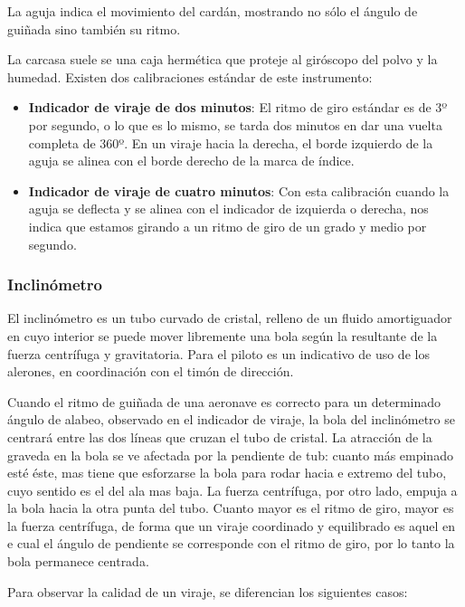 \documentclass{article}
\begin{document}
La aguja indica el movimiento del cardán, mostrando no sólo el ángulo de guiñada
sino también su ritmo.

La carcasa suele se una caja hermética que proteje al giróscopo del polvo y la humedad. Existen dos calibraciones estándar de este instrumento:

\begin{itemize}
  \item \textbf{Indicador de viraje de dos minutos}: El ritmo de giro estándar es de 3º por segundo, o lo que es lo mismo, se tarda dos minutos en dar una vuelta completa de 360º. En un viraje hacia la derecha, el borde izquierdo de la aguja se alinea con el borde derecho de la marca de índice.
  \item \textbf{Indicador de viraje de cuatro minutos}:  Con esta calibración  cuando la aguja se deflecta y se alinea con el indicador de izquierda o derecha, nos indica que estamos girando a un ritmo de giro de un grado y medio por segundo.
\end{itemize}

\subsubsection*{Inclinómetro}
El inclinómetro es un tubo curvado de cristal, relleno de un fluido amortiguador en cuyo interior se puede mover libremente una bola según la resultante de la fuerza centrífuga y gravitatoria. Para el piloto es un indicativo de uso de los alerones, en coordinación con el timón de dirección.

Cuando el ritmo de guiñada de una aeronave es correcto para un determinado ángulo de alabeo, observado en el indicador de viraje, la bola del inclinómetro se centrará entre las dos líneas que cruzan el tubo de cristal. 
La atracción de la graveda en la bola se ve afectada por la pendiente de tub: cuanto más empinado esté éste, mas tiene que esforzarse la bola para rodar hacia e extremo del tubo, cuyo sentido es el del ala mas baja. La fuerza centrífuga, por otro lado, empuja a la bola hacia la otra punta del tubo. Cuanto mayor es el ritmo de giro, mayor es la fuerza centrífuga, de forma que un viraje coordinado y equilibrado es aquel en e cual el ángulo de pendiente se corresponde con el ritmo de giro, por lo tanto la bola permanece centrada.

Para observar la calidad de un viraje, se diferencian los siguientes casos:
\end{document}
